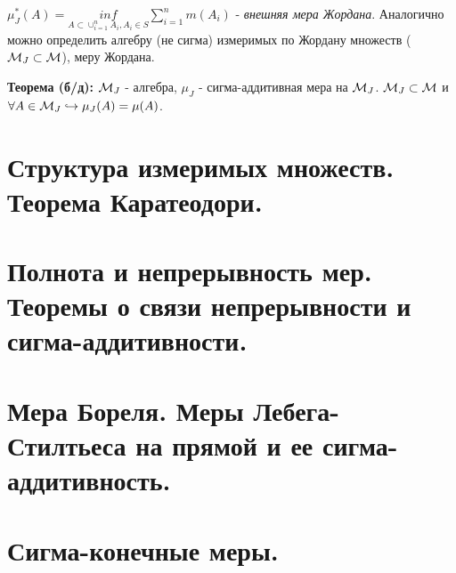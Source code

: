 \par \Def $\mu^*_J(A)=\underset{A\subset \cup_{i=1}^n A_i, A_i \in S}{inf}\sum_{i=1}^n m(A_i)$ - \textit{внешняя мера Жордана}. Аналогично можно определить алгебру (не сигма) измеримых по Жордану множеств ($\mathcal{M}_J \subset \mathcal{M}$), меру Жордана.

\par \textbf{Теорема (б/д):} $\mathcal{M}_J$ - алгебра, $\mu_J$ - сигма-аддитивная мера на $\mathcal{M}_J$. $\mathcal{M}_J \subset \mathcal{M}$ и $\forall A \in \mathcal{M}_J \hookrightarrow \mu_J(A)=\mu(A)$.
\newpage{}

\section{Структура измеримых множеств. Теорема Каратеодори.}


\newpage{}

\section{Полнота и непрерывность мер. Теоремы о связи непрерывности и сигма-аддитивности.}


\section{Мера Бореля. Меры Лебега-Стилтьеса на прямой и ее сигма-аддитивность.}

\newpage{}

\section{Сигма-конечные меры.}

